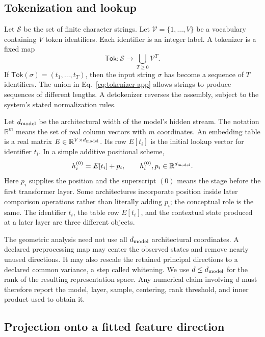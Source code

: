 \documentclass[
  aps,
  reprint,
  superscriptaddress,
  floatfix,
  nofootinbib,
  longbibliography
]{revtex4-2}
\newcommand{\R}{\mathbb{R}}
\begin{document}
\subsection{Tokenization and lookup}

Let $\mathcal S$ be the set of finite character strings.  Let
$\mathcal V=\{1,\ldots,V\}$ be a vocabulary containing $V$ token identifiers.
Each identifier is an integer label.  A tokenizer is a fixed map
\begin{equation}
 \mathsf{Tok}:\mathcal S\longrightarrow
 \bigcup_{T\geq0}\mathcal V^T.
 \label{eq:tokenizer-app}
\end{equation}
If $\mathsf{Tok}(\sigma)=(t_1,\ldots,t_T)$, then the input string $\sigma$
has become a sequence of $T$ identifiers.  The union in
Eq.~\eqref{eq:tokenizer-app} allows strings to produce sequences of different
lengths.  A detokenizer reverses the assembly, subject to the system's stated
normalization rules.

Let $d_{\rm model}$ be the architectural width of the model's hidden stream.
The notation $\R^m$ means the set of real column vectors with $m$ coordinates.
An embedding table is a real matrix
$E\in\R^{V\times d_{\rm model}}$.  Its row $E[t_i]$ is the initial lookup
vector for identifier $t_i$.  In a simple additive positional scheme,
\begin{equation}
 h_i^{(0)}=E[t_i]+p_i,
 \qquad h_i^{(0)},p_i\in\R^{d_{\rm model}}.
 \label{eq:lookup-app}
\end{equation}
Here $p_i$ supplies the position and the superscript $(0)$ means the stage
before the first transformer layer.  Some architectures incorporate position
inside later comparison operations rather than literally adding $p_i$; the
conceptual role is the same.  The identifier $t_i$, the table row $E[t_i]$, and the
contextual state produced at a later layer are three different objects.

The geometric analysis need not use all $d_{\rm model}$ architectural
coordinates.  A declared preprocessing map may center the observed states and
remove nearly unused directions.  It may also rescale the retained principal
directions to a declared common variance, a step called whitening.  We use
$d\leq d_{\rm model}$ for the rank of the resulting representation space.
Any numerical claim involving $d$ must therefore report the model,
layer, sample, centering, rank threshold, and inner product used to obtain it.

\subsection{Projection onto a fitted feature direction}
\end{document}
